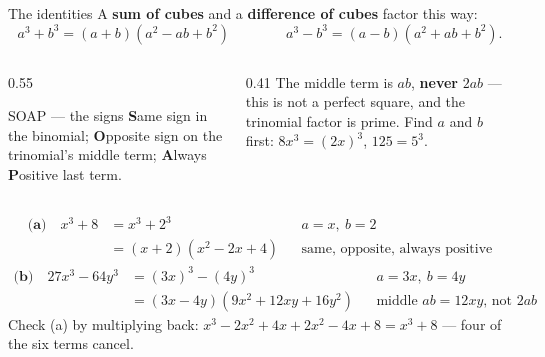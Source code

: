\documentclass[aspectratio=169, 11pt]{beamer}
\begin{document}
\begin{frame}[t, plain]
  \begin{block}{The identities}
    A \textbf{sum of cubes} and a \textbf{difference of cubes} factor this way:
    \[
      a^3+b^3=(a+b)(a^2-ab+b^2) \qquad\qquad a^3-b^3=(a-b)(a^2+ab+b^2).
    \]
  \end{block}
  \vspace{2pt}
  \begin{columns}[T]
    \begin{column}{0.55\textwidth}
      \begin{block}{SOAP --- the signs}
        \textbf{S}ame sign in the binomial; \textbf{O}pposite sign on the trinomial's middle
        term; \textbf{A}lways \textbf{P}ositive last term.
      \end{block}
    \end{column}
    \begin{column}{0.41\textwidth}
      \small The middle term is $ab$, \textbf{never} $2ab$ --- this is not a perfect square, and
      the trinomial factor is prime. Find $a$ and $b$ first: $8x^3=(2x)^3$, $125=5^3$.
    \end{column}
  \end{columns}
\end{frame}

\begin{frame}[t, plain]
  \[
  \begin{aligned}
    \textbf{(a)}\quad x^3+8 &= x^3+2^3 && a=x,\ b=2 \\
                            &= (x+2)(x^2-2x+4) && \text{same, opposite, always positive}
  \end{aligned}
  \]
  \pause
  \[
  \begin{aligned}
    \textbf{(b)}\quad 27x^3-64y^3 &= (3x)^3-(4y)^3 && a=3x,\ b=4y \\
                                  &= (3x-4y)(9x^2+12xy+16y^2) && \text{middle } ab=12xy\text{, not } 2ab
  \end{aligned}
  \]
  \pause
  {\small Check (a) by multiplying back: $x^3-2x^2+4x+2x^2-4x+8=x^3+8$ --- four of the six terms
  cancel.}
\end{frame}
\end{document}
